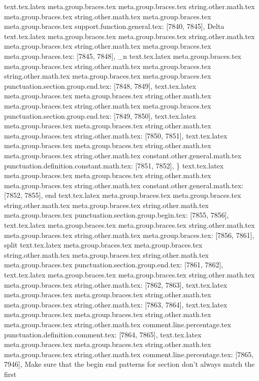 {{{{{{{{{{{{{{{{{{{{{{{{{{{{{{{{{{{{{{{{{{{{{{{{{{{{{{{{{{{{{{{{{{{{{{{{{{{{{{{{{{{{{{{{{{{{{{{{{{{{{{{{{{{{{{{{{{{{{{{{{{{{{{{{{{{{{{{{{{{{{{{{{{{{{{{{{{{{{{{{{{{{{{{{{{{{{{{{{{{{{{{{{{{{{{{{{{{{{{{{{{{{{{{{{{{{{{{{{{{{{{{{{{{{{{{{{{text.tex.latex meta.group.braces.tex meta.group.braces.tex string.other.math.tex meta.group.braces.tex string.other.math.tex meta.group.braces.tex meta.group.braces.tex support.function.general.tex: [7840, 7845], {Delta}
text.tex.latex meta.group.braces.tex meta.group.braces.tex string.other.math.tex meta.group.braces.tex string.other.math.tex meta.group.braces.tex meta.group.braces.tex: [7845, 7848], {_n }
text.tex.latex meta.group.braces.tex meta.group.braces.tex string.other.math.tex meta.group.braces.tex string.other.math.tex meta.group.braces.tex meta.group.braces.tex punctuation.section.group.end.tex: [7848, 7849], {}}
text.tex.latex meta.group.braces.tex meta.group.braces.tex string.other.math.tex meta.group.braces.tex string.other.math.tex meta.group.braces.tex punctuation.section.group.end.tex: [7849, 7850], {}}
text.tex.latex meta.group.braces.tex meta.group.braces.tex string.other.math.tex meta.group.braces.tex string.other.math.tex: [7850, 7851], {
}
text.tex.latex meta.group.braces.tex meta.group.braces.tex string.other.math.tex meta.group.braces.tex string.other.math.tex constant.other.general.math.tex punctuation.definition.constant.math.tex: [7851, 7852], {\}
text.tex.latex meta.group.braces.tex meta.group.braces.tex string.other.math.tex meta.group.braces.tex string.other.math.tex constant.other.general.math.tex: [7852, 7855], {end}
text.tex.latex meta.group.braces.tex meta.group.braces.tex string.other.math.tex meta.group.braces.tex string.other.math.tex meta.group.braces.tex punctuation.section.group.begin.tex: [7855, 7856], {{}
text.tex.latex meta.group.braces.tex meta.group.braces.tex string.other.math.tex meta.group.braces.tex string.other.math.tex meta.group.braces.tex: [7856, 7861], {split}
text.tex.latex meta.group.braces.tex meta.group.braces.tex string.other.math.tex meta.group.braces.tex string.other.math.tex meta.group.braces.tex punctuation.section.group.end.tex: [7861, 7862], {}}
text.tex.latex meta.group.braces.tex meta.group.braces.tex string.other.math.tex meta.group.braces.tex string.other.math.tex: [7862, 7863], {
}
text.tex.latex meta.group.braces.tex meta.group.braces.tex string.other.math.tex meta.group.braces.tex string.other.math.tex: [7863, 7864], {
}
text.tex.latex meta.group.braces.tex meta.group.braces.tex string.other.math.tex meta.group.braces.tex string.other.math.tex comment.line.percentage.tex punctuation.definition.comment.tex: [7864, 7865], {%
text.tex.latex meta.group.braces.tex meta.group.braces.tex string.other.math.tex meta.group.braces.tex string.other.math.tex comment.line.percentage.tex: [7865, 7946], { Make sure that the begin end patterns for section don't always match the first }}
}}}}}}}}}}}}}}}}}}}}}}}}}}}}}}}}}}}}}}}}}}}}}}}}}}}}}}}}}}}}}}}}}}}}}}}}}}}}}}}}}}}}}}}}}}}}}}}}}}}}}}}}}}}}}}}}}}}}}}}}}}}}}}}}}}}}}}}}}}}}}}}}}}}}}}}}}}}}}}}}}}}}}}}}}}}}}}}}}}}}}}}}}}}}}}}}}}}}}}}}}}}}}}}}}}}}}}}}}}}}}}}}}}}}}}}}}
